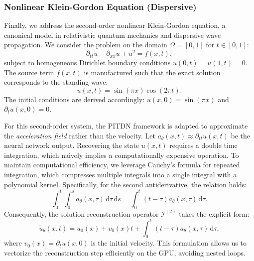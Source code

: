 \documentclass[11pt,reqno]{amsart}
\theoremstyle{plain}
\theoremstyle{definition}
\theoremstyle{remark}
\newcommand{\dd}{\mathrm{d}}
\begin{document}
\subsubsection{Nonlinear Klein-Gordon Equation (Dispersive)}

Finally, we address the second-order nonlinear Klein-Gordon equation, a canonical model in relativistic quantum mechanics and dispersive wave propagation. We consider the problem on the domain $\Omega = [0, 1]$ for $t \in [0, 1]$:
\begin{equation}
    \partial_{tt} u - \partial_{xx} u + u^2 = f(x,t),
\end{equation}
subject to homogeneous Dirichlet boundary conditions $u(0,t) = u(1,t) = 0$. The source term $f(x,t)$ is manufactured such that the exact solution corresponds to the standing wave:
\begin{equation}
    u(x,t) = \sin(\pi x) \cos(2\pi t).
\end{equation}
The initial conditions are derived accordingly: $u(x,0) = \sin(\pi x)$ and $\partial_t u(x,0) = 0$.


For this second-order system, the PITDN framework is adapted to approximate the \textit{acceleration field} rather than the velocity. Let $a_\theta(x,t) \approx \partial_{tt} u(x,t)$ be the neural network output. Recovering the state $u(x,t)$ requires a double time integration, which naively implies a computationally expensive operation. To maintain computational efficiency, we leverage {Cauchy's formula for repeated integration}, which compresses multiple integrals into a single integral with a polynomial kernel. Specifically, for the second antiderivative, the relation holds:
\begin{equation} \label{eq:cauchy_formula}
    \int_0^t \int_0^s a_\theta(x,\tau) \, \dd\tau \, \dd s = \int_0^t (t - \tau) a_\theta(x,\tau) \, \dd\tau.
\end{equation}
Consequently, the solution reconstruction operator $\mathcal{I}^{(2)}$ takes the explicit form:
\begin{equation}
    \tilde{u}_\theta(x,t) = u_0(x) + v_0(x)t + \int_0^t (t - \tau) a_\theta(x,\tau) \, \dd\tau,
\end{equation}
where $v_0(x) = \partial_t u(x,0)$ is the initial velocity. This formulation allows us to vectorize the reconstruction step efficiently on the GPU, avoiding nested loops.
\end{document}
